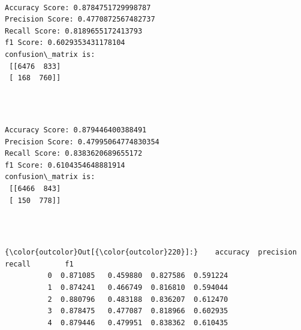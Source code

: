 \documentclass[11pt]{article}
\begin{document}
   

    \begin{center}
    \end{center}
    { \hspace*{\fill} \\}
    
    \begin{Verbatim}[commandchars=\\\{\}]
Accuracy Score: 0.8784751729998787
Precision Score: 0.4770872567482737
Recall Score: 0.8189655172413793
f1 Score: 0.6029353431178104
confusion\_matrix is: 
 [[6476  833]
 [ 168  760]] 


    \end{Verbatim}

   

    \begin{center}
    \end{center}
    { \hspace*{\fill} \\}
    
   

    \begin{Verbatim}[commandchars=\\\{\}]
Accuracy Score: 0.879446400388491
Precision Score: 0.47995064774830354
Recall Score: 0.8383620689655172
f1 Score: 0.6104354648881914
confusion\_matrix is: 
 [[6466  843]
 [ 150  778]] 


    \end{Verbatim}

    \begin{center}
    \end{center}
    { \hspace*{\fill} \\}
    
\begin{Verbatim}[commandchars=\\\{\}]
{\color{outcolor}Out[{\color{outcolor}220}]:}    accuracy  precision    recall        f1
          0  0.871085   0.459880  0.827586  0.591224
          1  0.874241   0.466749  0.816810  0.594044
          2  0.880796   0.483188  0.836207  0.612470
          3  0.878475   0.477087  0.818966  0.602935
          4  0.879446   0.479951  0.838362  0.610435
\end{Verbatim}
            
\end{document}
